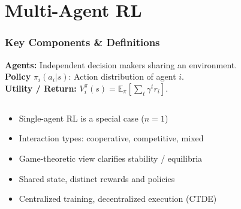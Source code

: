 \section{Multi-Agent RL}
\begin{frame}
    \frametitle{Key Components \& Definitions}
    \textbf{Agents:} Independent decision makers sharing an environment. \\
            \textbf{Policy }$\pi_i(a_i|s)$: Action distribution of agent $i$. \\
            \textbf{Utility / Return:} $V_i^{\pi}(s)=\mathbb{E}_\pi\!\left[\sum_t \gamma^t r_i\right]$.
    \begin{columns}[T]
        \begin{column}{0.52\textwidth}
            \small
            \begin{itemize}\setlength{\itemsep}{3pt}
                \item Single-agent RL is a special case ($n=1$)
                \item Interaction types: cooperative, competitive, mixed
                \item Game-theoretic view clarifies stability / equilibria
                \item Shared state, distinct rewards and policies
                \item Centralized training, decentralized execution (CTDE)
            \end{itemize}
        \end{column}
        \begin{column}{0.48\textwidth}
            \begin{figure}
            	\centering
                \vspace{-1cm}
\end{figure}
\end{column}
\end{columns}
\end{frame}
